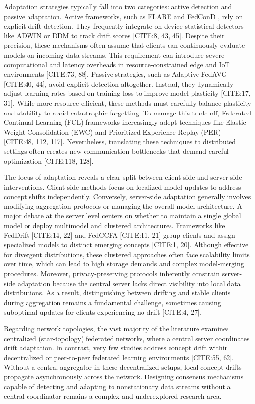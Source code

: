 \documentclass[journal]{IEEEtran}
\begin{document}
Adaptation strategies typically fall into two categories: active detection and passive adaptation. Active frameworks, such as FLARE \cite{Chow2023} and FedConD \cite{Chen2021}, rely on explicit drift detection. They frequently integrate on-device statistical detectors like ADWIN or DDM to track drift scores [CITE:8, 43, 45]. Despite their precision, these mechanisms often assume that clients can continuously evaluate models on incoming data streams. This requirement can introduce severe computational and latency overheads in resource-constrained edge and IoT environments [CITE:73, 88]. Passive strategies, such as Adaptive-FedAVG [CITE:40, 44], avoid explicit detection altogether. Instead, they dynamically adjust learning rates based on training loss to improve model plasticity [CITE:17, 31]. While more resource-efficient, these methods must carefully balance plasticity and stability to avoid catastrophic forgetting. To manage this trade-off, Federated Continual Learning (FCL) frameworks increasingly adopt techniques like Elastic Weight Consolidation (EWC) and Prioritized Experience Replay (PER) [CITE:48, 112, 117]. Nevertheless, translating these techniques to distributed settings often creates new communication bottlenecks that demand careful optimization [CITE:118, 128].

The locus of adaptation reveals a clear split between client-side and server-side interventions. Client-side methods focus on localized model updates to address concept shifts independently. Conversely, server-side adaptation generally involves modifying aggregation protocols or managing the overall model architecture. A major debate at the server level centers on whether to maintain a single global model or deploy multimodel and clustered architectures. Frameworks like FedDrift [CITE:14, 22] and FedCCFA [CITE:11, 21] group clients and assign specialized models to distinct emerging concepts [CITE:1, 20]. Although effective for divergent distributions, these clustered approaches often face scalability limits over time, which can lead to high storage demands and complex model-merging procedures. Moreover, privacy-preserving protocols inherently constrain server-side adaptation because the central server lacks direct visibility into local data distributions. As a result, distinguishing between drifting and stable clients during aggregation remains a fundamental challenge, sometimes causing suboptimal updates for clients experiencing no drift [CITE:4, 27].

Regarding network topologies, the vast majority of the literature examines centralized (star-topology) federated networks, where a central server coordinates drift adaptation. In contrast, very few studies address concept drift within decentralized or peer-to-peer federated learning environments [CITE:55, 62]. Without a central aggregator in these decentralized setups, local concept drifts propagate asynchronously across the network. Designing consensus mechanisms capable of detecting and adapting to nonstationary data streams without a central coordinator remains a complex and underexplored research area.
\end{document}
